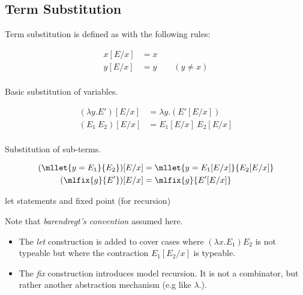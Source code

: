 \subsection{Term Substitution}
Term substitution is defined as with the following rules:
\\ \begin{minipage}[t]{.5\textwidth}
	\[\begin{split}
			x[E/x] &= x \\
			y[E/x] &= y \qquad (y \neq x) \\
		\end{split}\]
	\centerline{Basic substitution of variables.}
\end{minipage}
\begin{minipage}[t]{.5\textwidth}
	\[\begin{split}
			(\lambda y . E')[E/x] &= \lambda y.(E'[E/x]) \\
			(E_1 \ E_2)[E/x] &= E_1[E/x] \ E_2[E/x] \\
		\end{split}\]
	\centerline{Substitution of sub-terms.}
\end{minipage}
\vspace{5mm}
\[\begin{split}
		(\mllet{y = E_1}{E_2})[E/x] &= \mllet{y = E_1[E/x]}{E_2[E/x]} \\
		(\mlfix{g}{E'})[E/x] &= \mlfix{g}{E'[E/x]} \\
	\end{split}\]
\centerline{let statements and fixed point (for recursion)}
Note that \textit{barendregt's convention} assumed here.
\begin{itemize}
	\item The \textit{let} construction is added to cover cases where $(\lambda x . E_1) E_2$ is not typeable but where the contraction $E_1[E_2/x]$ is typeable.
	\item The \textit{fix} construction introduces model recursion. It is not a combinator, but rather another abstraction mechanism (e.g like $\lambda . $).
\end{itemize}

